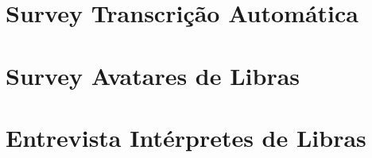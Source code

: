 \documentclass[doutorado, pos-defesa]{packages/icmc}
\begin{document}

\begin{apendicesenv}

\chapter{Survey Transcrição Automática}
\label{appendix:asr-survey}


\chapter{Survey Avatares de Libras}
\label{appendix:libras-survey}


\chapter{Entrevista Intérpretes de Libras}
\label{appendix:libras-interview}


\end{apendicesenv}




%     

\end{document}
